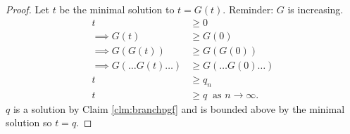\begin{proof}
    Let $t$ be the minimal solution to $t = G(t)$.
    Reminder: $G$ is increasing.
    \begin{align*}
        t &\geq 0 \\
        \implies G(t) &\geq G(0) \\
        \implies G(G(t)) &\geq G(G(0)) \\
        \implies G(\dots G(t) \dots) &\geq G(\dots G(0) \dots) \\
        t &\geq q_n \\
        t &\geq q \ \text{ as } n \to \infty.
    \end{align*} 
    $q$ is a solution by Claim \ref{clm:branchpgf} and is bounded above by the minimal solution so $t = q$.
\end{proof}